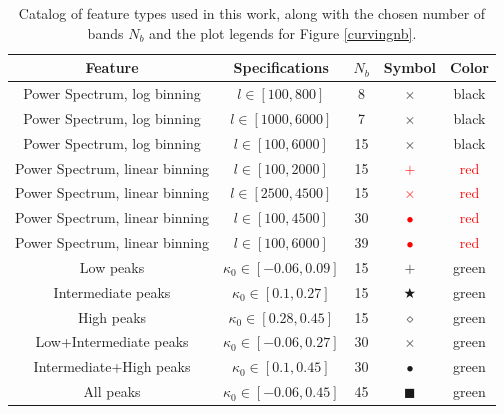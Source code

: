 \documentclass[reprint,aps,prd,superscriptaddress,showkeys,showpacs]{revtex4-1}
\begin{document}
\begin{table}
\begin{center}
\begin{tabular}{ccccc}
\toprule
\textbf{Feature} &  \textbf{Specifications} & $N_b$ &  \textbf{Symbol} & \textbf{Color} \\ \hline \hline
\midrule
Power Spectrum, log binning  & $l \in [100,800] $ & 8 & $\times$ & black  \\ 
Power Spectrum, log binning  & $l \in [1000,6000] $ & 7 & $\times$ & black  \\ 
Power Spectrum, log binning  & $l \in [100,6000] $ & 15 & $\times$ & black  \\
Power Spectrum, linear binning  & $l \in [100,2000] $ & 15 & \textcolor{red}{$+$} & \textcolor{red}{red}  \\ 
Power Spectrum, linear binning  & $l \in [2500,4500] $ & 15 & \textcolor{red}{$\times$} & \textcolor{red}{red}  \\
Power Spectrum, linear binning  & $l \in [100,4500] $ & 30 & \textcolor{red}{$\bullet$} & \textcolor{red}{red}  \\ 
Power Spectrum, linear binning  & $l \in [100,6000] $ & 39 & \textcolor{red}{$\bullet$} & \textcolor{red}{red}  \\ \hline
Low peaks  & $\kappa_0 \in [-0.06,0.09] $ & 15 & \textcolor{OliveGreen}{$+$} & \textcolor{OliveGreen}{green}  \\ 
Intermediate peaks  & $\kappa_0 \in [0.1,0.27] $ & 15 & \textcolor{OliveGreen}{$\bigstar$} & \textcolor{OliveGreen}{green}  \\ 
High peaks  & $\kappa_0 \in [0.28,0.45] $ & 15 & \textcolor{OliveGreen}{$\diamond$} & \textcolor{OliveGreen}{green}  \\
Low+Intermediate peaks  & $\kappa_0 \in [-0.06,0.27] $ & 30 & \textcolor{OliveGreen}{$\times$} & \textcolor{OliveGreen}{green}  \\
Intermediate+High peaks  & $\kappa_0 \in [0.1,0.45] $ & 30 & \textcolor{OliveGreen}{$\bullet$} & \textcolor{OliveGreen}{green}  \\
All peaks  & $\kappa_0 \in [-0.06,0.45] $ & 45 & \textcolor{OliveGreen}{$\blacksquare$} & \textcolor{OliveGreen}{green}  \\ \hline
\bottomrule
\end{tabular}
\end{center}
\caption{Catalog of feature types used in this work, along with the chosen number of bands $N_b$ and the plot legends for Figure \ref{curvingnb}.}
\label{featuretable}
\end{table}
\end{document}
